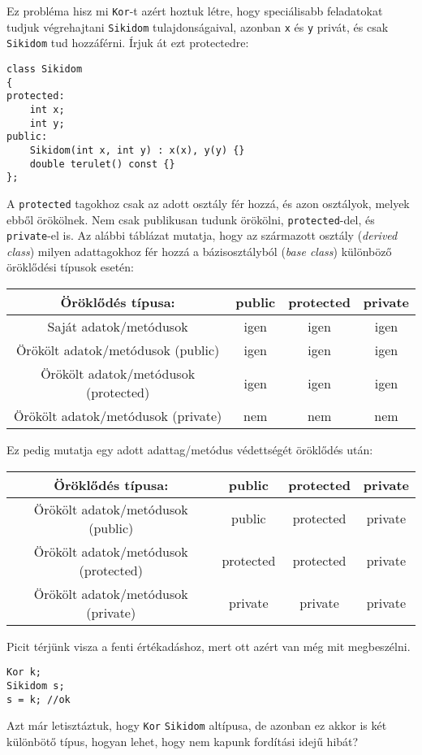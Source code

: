 \documentclass[a4paper,11.5pt]{article}
\begin{document}
	Ez probléma hisz mi \texttt{Kor}-t azért hoztuk létre, hogy speciálisabb feladatokat tudjuk végrehajtani \texttt{Sikidom} tulajdonságaival, azonban \texttt{x} és \texttt{y} privát, és csak \texttt{Sikidom} tud hozzáférni. Írjuk át ezt protectedre:
\begin{lstlisting}
class Sikidom
{
protected:
	int x;
	int y;
public:
	Sikidom(int x, int y) : x(x), y(y) {}
	double terulet() const {}
};
\end{lstlisting}
	A \texttt{protected} tagokhoz csak az adott osztály fér hozzá, és azon osztályok, melyek ebből örökölnek. Nem csak publikusan tudunk örökölni, \texttt{protected}-del, és \texttt{private}-el is. Az alábbi táblázat mutatja, hogy az származott osztály (\textit{derived class}) milyen adattagokhoz fér hozzá a bázisosztályból (\textit{base class}) különböző öröklődési típusok esetén:
	\begin{center}
		\begin{tabular}{|c||c|c|c|}
			\hline
			Öröklődés típusa:&public&protected&private\\
			\hline
			\hline
			Saját adatok/metódusok& \cellcolor{green!20}igen&\cellcolor{green!20}igen&\cellcolor{green!20}igen\\
			\hline
			Örökölt adatok/metódusok (public)&\cellcolor{green!20}igen&\cellcolor{green!20}igen&\cellcolor{green!20}igen\\
			\hline
			Örökölt adatok/metódusok (protected)&\cellcolor{green!20}igen&\cellcolor{green!20}igen&\cellcolor{green!20}igen\\
			\hline
			Örökölt adatok/metódusok (private)&\cellcolor{red!20}nem&\cellcolor{red!20}nem&\cellcolor{red!20}nem\\
			\hline
		\end{tabular}
	\end{center}
	Ez pedig mutatja egy adott adattag/metódus védettségét öröklődés után:
	\begin{center}
		\begin{tabular}{|c||c|c|c|}
			\hline
			Öröklődés típusa:&public&protected&private\\
			\hline
			\hline
			Örökölt adatok/metódusok (public)&\cellcolor{green!20}public&\cellcolor{orange!20}protected&\cellcolor{red!20}private\\
			\hline
			Örökölt adatok/metódusok (protected)&\cellcolor{orange!20}protected&\cellcolor{orange!20}protected&\cellcolor{red!20}private\\
			\hline
			Örökölt adatok/metódusok (private)&\cellcolor{red!20}private&\cellcolor{red!20}private&\cellcolor{red!20}private\\
			\hline
		\end{tabular}
	\end{center}
	Picit térjünk visza a fenti értékadáshoz, mert ott azért van még mit megbeszélni.
	\begin{lstlisting}
Kor k;
Sikidom s;
s = k; //ok
	\end{lstlisting}
	Azt már letisztáztuk, hogy \texttt{Kor} \texttt{Sikidom} altípusa, de azonban ez akkor is két különbötő típus, hogyan lehet, hogy nem kapunk fordítási idejű hibát?
	
\end{document}
